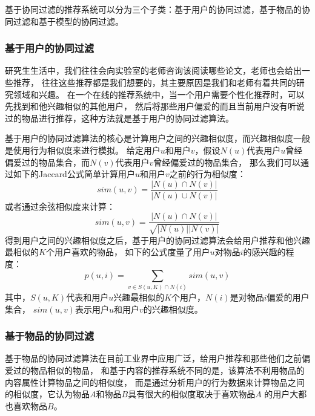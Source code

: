基于协同过滤的推荐系统可以分为三个子类：基于用户的协同过滤，基于物品的协同过滤和基于模型的协同过滤。
\subsubsection{基于用户的协同过滤}
研究生生活中，我们往往会向实验室的老师咨询该阅读哪些论文，老师也会给出一些推荐，
往往这些推荐都是我们想要的，其主要原因是我们和老师有着共同的研究领域和兴趣。
在一个在线的推荐系统中，当一个用户需要个性化推荐时，可以先找到和他兴趣相似的其他用户，
然后将那些用户偏爱的而且当前用户没有听说过的物品进行推荐，这种方法就是基于用户的协同过滤算法。

基于用户的协同过滤算法的核心是计算用户之间的兴趣相似度，而兴趣相似度一般是使用行为相似度来进行模拟。
给定用户$u$和用户$v$，假设$N(u)$代表用户$u$曾经偏爱过的物品集合，而$N(v)$代表用户$v$曾经偏爱过的物品集合，
那么我们可以通过如下的Jaccard公式简单计算用户$u$和用户$v$之前的行为相似度：
\begin{equation}
sim(u, v) = \frac{ |N(u) \cap N(v)| } { |N(u) \cup N(v)| }
\end{equation}
或者通过余弦相似度来计算：
\begin{equation}
sim(u, v) = \frac{ |N(u) \cap N(v)| } { \sqrt{ |N(u)| |N(v)| } }
\end{equation}
得到用户之间的兴趣相似度之后，基于用户的协同过滤算法会给用户推荐和他兴趣最相似的$K$个用户喜欢的物品，
如下的公式度量了用户$u$对物品$i$的感兴趣的程度：
\begin{equation}
p(u, i) = \sum_{v \in S(u, K) \cap N(i) }{ sim(u, v) }
\end{equation}
其中，$S(u, K)$代表和用户$u$兴趣最相似的$K$个用户，$N(i)$是对物品$i$偏爱的用户集合，
$sim(u, v)$表示用户$u$和用户$v$的兴趣相似度。

\subsubsection{基于物品的协同过滤}
基于物品的协同过滤算法在目前工业界中应用广泛，给用户推荐和那些他们之前偏爱过的物品相似的物品，
和基于内容的推荐系统不同的是，该算法不利用物品的内容属性计算物品之间的相似度，
而是通过分析用户的行为数据来计算物品之间的相似度，它认为物品$A$和物品$B$具有很大的相似度取决于喜欢物品$A$
的用户大都也喜欢物品$B$。

